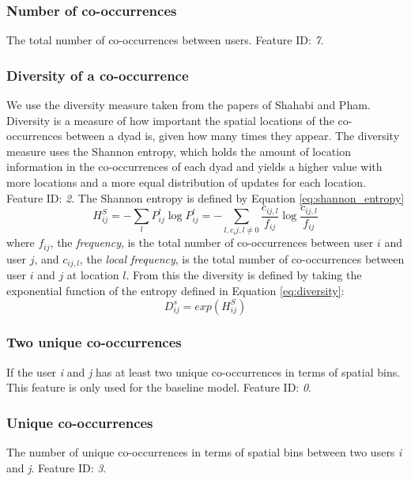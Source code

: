 \subsubsection{Number of co-occurrences}
The total number of co-occurrences between users. Feature ID: \textit{7}.

\subsubsection{Diversity of a co-occurrence}
We use the diversity measure taken from the papers of Shahabi and Pham\cite{iRWRfSD}\cite{AEBMtISSfSD}.
Diversity is a measure of how important the spatial locations of the co-occurrences between a dyad is, given how many times they appear.
The diversity measure uses the Shannon entropy, which holds the amount of location information in the co-occurrences of each dyad and yields a higher value with more locations and a more equal distribution of updates for each location.
Feature ID: \textit{2}.
The Shannon entropy is defined by Equation \ref{eq:shannon_entropy}
\begin{equation}
\label{eq:shannon_entropy}
H^S_{ij}=-\sum\limits_{l}P^l_{ij} \log P^l_{ij}= -\sum\limits_{l,c_ij,l\neq 0}\frac{c_{ij,l}}{f_{ij}}\log \frac{c_{ij,l}}{f_{ij}}
\end{equation}
where $f_{ij}$, the \textit{frequency}, is the total number of co-occurrences between user $i$ and user $j$, and $c_{ij,l}$, the \textit{local frequency}, is the total number of co-occurrences between user $i$ and $j$ at location $l$.
From this the diversity is defined by taking the exponential function of the entropy defined in Equation \ref{eq:diversity}:
\begin{equation}
\label{eq:diversity}
D^s_{ij} = exp(H^S_{ij})
\end{equation}

\subsubsection{Two unique co-occurrences}
If the user \textit{i} and \textit{j} has at least two unique co-occurrences in terms of spatial bins. This feature is only used for the baseline model. Feature ID: \textit{0}.

\subsubsection{Unique co-occurrences}
The number of unique co-occurrences in terms of spatial bins between two users \textit{i} and \textit{j}. Feature ID: \textit{3}.

